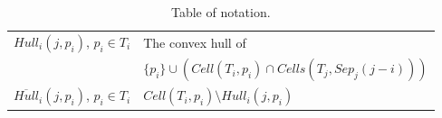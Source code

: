 \documentclass[10pt,a4paper]{amsart}
\newcommand{\ovar}[1]{\overrightarrow{#1}}
\newcommand{\Cell}{\mathit{Cell}}
\newcommand{\Cells}{\mathit{Cells}}
\newcommand{\Sep}{\mathit{Sep}}
\newcommand{\Hull}{\mathit{Hull}}
\newcommand{\mcS}{\mathcal{S}}
\newcommand{\john}[1]{\textcolor{red}{#1}}
\newcommand{\yakov}[1]{\textcolor{blue}{Yakov: #1}}
\begin{document}
\begin{table}
\begin{tabular}{|c|p{3.5in}|}
$\Hull_i(j,p_i)$, $p_i \in T_i$ & The convex hull of\\
 & \hspace{.5cm} $ \{p_i\} \cup ( \Cell(T_i,p_i) \cap   \Cells(T_j,\Sep_j(j-i)) ) $
\\
$\overline{\Hull}_i(j,p_i)$, $p_i \in T_i$ & 
$\Cell(T_i,p_i) \setminus \Hull_i(j,p_i)$
\\ \hline
\end{tabular}

\caption{
    Table of notation. }
    \label{table-of-notation}
\end{table}
\end{document}
